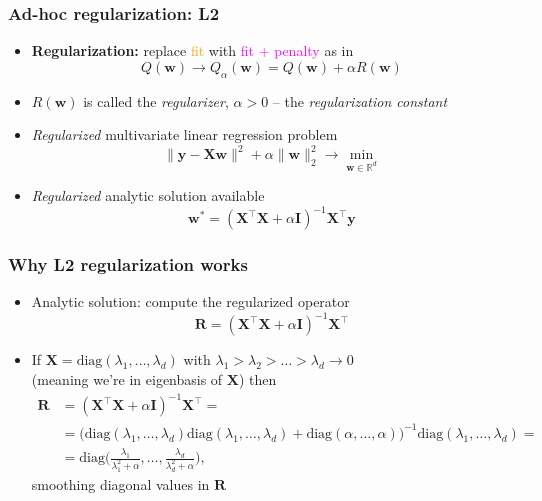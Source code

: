 \documentclass[usenames,dvipsnames,aspectratio=169]{beamer}
\begin{document}
\begin{frame}
\frametitle{Ad-hoc regularization: L2}

\begin{itemize}
  \item \textbf{Regularization:}
    replace \textcolor{orange}{fit} 
    with \textcolor{Fuchsia}{fit + penalty} as in 
    \[
    Q(\mathbf{w}) \to 
      Q_{\alpha}(\mathbf{w}) = Q(\mathbf{w}) + \alpha R(\mathbf{w})
    \]

  \pause
  \item $R(\mathbf{w})$ is called the \textit{regularizer},
  $\alpha > 0$ -- the \textit{regularization constant}


  \pause
  \item \textit{Regularized} multivariate linear regression problem
  \[
    \lVert \bm{y} - \bm{X} \mathbf{w}  \rVert^2 
    +
    \alpha \lVert \mathbf{w} \rVert^2_2
    \to 
    \min_{\mathbf{w} \in \mathbb{R}^d}
  \]

  \pause
  \item \textit{Regularized} analytic solution
  available
  \[
  \mathbf{w}^* =
  ( \bm{X}^{\intercal} \bm{X} + \alpha \bm{I})^{-1}
  \bm{X}^{\intercal} \bm{y}
  \]

\end{itemize}

\end{frame}



\begin{frame}
\frametitle{Why L2 regularization works}

\begin{itemize}
  \item Analytic solution: compute the regularized operator
  \[
  \bm{R} =
  ( \bm{X}^{\intercal} \bm{X} + \alpha \bm{I})^{-1} \bm{X}^{\intercal}
  \]

  \pause
  \item If $\bm{X} = \mbox{diag}(\lambda_1, \ldots, \lambda_d)$
    with $\lambda_1 > \lambda_2 > \ldots > \lambda_d \to 0$\\
    (meaning we're in eigenbasis of $\bm{X}$) then
  \begin{align*}
    \bm{R} &= ( \bm{X}^{\intercal} \bm{X}  + \alpha \bm{I})^{-1}
      \bm{X}^{\intercal} = \\
    &= 
    \big(\mbox{diag}(\lambda_1, \ldots, \lambda_d)
    \mbox{diag}(\lambda_1, \ldots, \lambda_d)
    +
    \mbox{diag}(\alpha, \ldots, \alpha)
    \big)^{-1}
    \mbox{diag}(\lambda_1, \ldots, \lambda_d) = \\
    &= \mbox{diag}\Big(\frac {\lambda_1} {\lambda^2_1 + \alpha}, 
      \ldots, \frac {\lambda_d} {\lambda^2_d + \alpha}\Big),
  \end{align*}
    smoothing diagonal values in $\bm{R}$ 

\end{itemize}

\end{frame}
\end{document}
